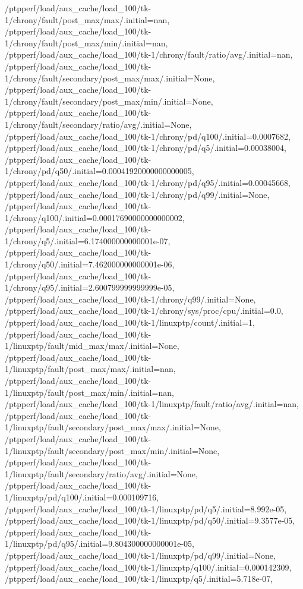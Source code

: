 {    /ptpperf/load/aux_cache/load_100/tk-1/chrony/fault/post_max/max/.initial=nan,
    /ptpperf/load/aux_cache/load_100/tk-1/chrony/fault/post_max/min/.initial=nan,
    /ptpperf/load/aux_cache/load_100/tk-1/chrony/fault/ratio/avg/.initial=nan,
    /ptpperf/load/aux_cache/load_100/tk-1/chrony/fault/secondary/post_max/max/.initial=None,
    /ptpperf/load/aux_cache/load_100/tk-1/chrony/fault/secondary/post_max/min/.initial=None,
    /ptpperf/load/aux_cache/load_100/tk-1/chrony/fault/secondary/ratio/avg/.initial=None,
    /ptpperf/load/aux_cache/load_100/tk-1/chrony/pd/q100/.initial=0.0007682,
    /ptpperf/load/aux_cache/load_100/tk-1/chrony/pd/q5/.initial=0.00038004,
    /ptpperf/load/aux_cache/load_100/tk-1/chrony/pd/q50/.initial=0.00041920000000000005,
    /ptpperf/load/aux_cache/load_100/tk-1/chrony/pd/q95/.initial=0.00045668,
    /ptpperf/load/aux_cache/load_100/tk-1/chrony/pd/q99/.initial=None,
    /ptpperf/load/aux_cache/load_100/tk-1/chrony/q100/.initial=0.00017690000000000002,
    /ptpperf/load/aux_cache/load_100/tk-1/chrony/q5/.initial=6.174000000000001e-07,
    /ptpperf/load/aux_cache/load_100/tk-1/chrony/q50/.initial=7.462000000000001e-06,
    /ptpperf/load/aux_cache/load_100/tk-1/chrony/q95/.initial=2.600799999999999e-05,
    /ptpperf/load/aux_cache/load_100/tk-1/chrony/q99/.initial=None,
    /ptpperf/load/aux_cache/load_100/tk-1/chrony/sys/proc/cpu/.initial=0.0,
    /ptpperf/load/aux_cache/load_100/tk-1/linuxptp/count/.initial=1,
    /ptpperf/load/aux_cache/load_100/tk-1/linuxptp/fault/mid_max/max/.initial=None,
    /ptpperf/load/aux_cache/load_100/tk-1/linuxptp/fault/post_max/max/.initial=nan,
    /ptpperf/load/aux_cache/load_100/tk-1/linuxptp/fault/post_max/min/.initial=nan,
    /ptpperf/load/aux_cache/load_100/tk-1/linuxptp/fault/ratio/avg/.initial=nan,
    /ptpperf/load/aux_cache/load_100/tk-1/linuxptp/fault/secondary/post_max/max/.initial=None,
    /ptpperf/load/aux_cache/load_100/tk-1/linuxptp/fault/secondary/post_max/min/.initial=None,
    /ptpperf/load/aux_cache/load_100/tk-1/linuxptp/fault/secondary/ratio/avg/.initial=None,
    /ptpperf/load/aux_cache/load_100/tk-1/linuxptp/pd/q100/.initial=0.000109716,
    /ptpperf/load/aux_cache/load_100/tk-1/linuxptp/pd/q5/.initial=8.992e-05,
    /ptpperf/load/aux_cache/load_100/tk-1/linuxptp/pd/q50/.initial=9.3577e-05,
    /ptpperf/load/aux_cache/load_100/tk-1/linuxptp/pd/q95/.initial=9.804300000000001e-05,
    /ptpperf/load/aux_cache/load_100/tk-1/linuxptp/pd/q99/.initial=None,
    /ptpperf/load/aux_cache/load_100/tk-1/linuxptp/q100/.initial=0.000142309,
    /ptpperf/load/aux_cache/load_100/tk-1/linuxptp/q5/.initial=5.718e-07,
}
